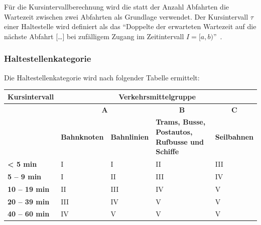 Für die Kursintervallberechnung wird die statt der Anzahl Abfahrten die Wartezeit zwischen zwei Abfahrten als Grundlage verwendet.
Der Kursintervall $\tau$ einer \gls{Haltestelle} wird definiert als das "`Doppelte der erwarteten Wartezeit auf die nächste Abfahrt [\ldots] bei zufälligem Zugang im Zeitintervall $I = [a,b)$"'~\cite{visum_manual_formula}.

\subsubsection{Haltestellenkategorie}
\label{Zusammenhang zur Berechnungsmethodik ARE:Haltestellenkategorie}

\begin{itquote}
Die Haltestellenkategorie wird nach folgender Tabelle ermittelt:
\begin{table}[ht]
    \centering
    \begin{itquote}
    \begin{tabular}[c]{l | p{2.3cm} p{2.3cm} | p{2.2cm} | p{2.2cm}}
        \toprule
        \textbf{Kursintervall}
                                & \multicolumn{4}{c}{\textbf{Verkehrsmittelgruppe}}\\
        \midrule
        \textbf{}
                                & \multicolumn{2}{c|}{\textbf{A}}
                                & \multicolumn{1}{c}{\textbf{B}}
                                & \multicolumn{1}{c}{\textbf{C}}\\
        \textbf{}
                                & \textbf{Bahnknoten}
                                & \textbf{Bahnlinien}
                                & \textbf{Trams, Busse, Postautos, Rufbusse und Schiffe}
                                & \textbf{Seilbahnen}\\
        \textbf{< 5 min}
                                & I
                                & I
                                & II
                                & III\\
        \textbf{5 -- 9 min}
                                & I
                                & II
                                & III
                                & IV\\
        \textbf{10 -- 19 min}
                                & II
                                & III
                                & IV
                                & V\\
        \textbf{20 -- 39 min}
                                & III
                                & IV
                                & V
                                & V\\
        \textbf{40 -- 60 min}
                                & IV
                                & V
                                & V
                                & V\\
        \bottomrule
    \end{tabular}
    \end{itquote}
\end{table}
\end{itquote}

